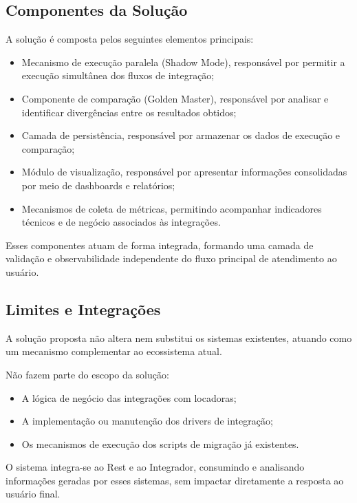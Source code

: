 \subsection{Componentes da Solução}

A solução é composta pelos seguintes elementos principais:

\begin{itemize}
    \item Mecanismo de execução paralela (Shadow Mode), responsável por permitir a execução simultânea dos fluxos de integração;
    \item Componente de comparação (Golden Master), responsável por analisar e identificar divergências entre os resultados obtidos;
    \item Camada de persistência, responsável por armazenar os dados de execução e comparação;
    \item Módulo de visualização, responsável por apresentar informações consolidadas por meio de dashboards e relatórios;
    \item Mecanismos de coleta de métricas, permitindo acompanhar indicadores técnicos e de negócio associados às integrações.
\end{itemize}

Esses componentes atuam de forma integrada, formando uma camada de validação e observabilidade independente do fluxo principal de atendimento ao usuário.

\subsection{Limites e Integrações}

A solução proposta não altera nem substitui os sistemas existentes, atuando como um mecanismo complementar ao ecossistema atual.

Não fazem parte do escopo da solução:

\begin{itemize}
    \item A lógica de negócio das integrações com locadoras;
    \item A implementação ou manutenção dos drivers de integração;
    \item Os mecanismos de execução dos scripts de migração já existentes.
\end{itemize}

O sistema integra-se ao Rest e ao Integrador, consumindo e analisando informações geradas por esses sistemas, sem impactar diretamente a resposta ao usuário final.

